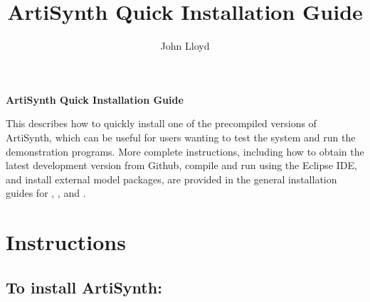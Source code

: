 \documentclass{article}
\title{ArtiSynth Quick Installation Guide}
\author{John Lloyd}
\date{}
\begin{document}

\iflatexml{\large\pubdate}\fi


\iflatexml\else
\begin{center}
{\sffamily\Large\bfseries ArtiSynth Quick Installation Guide}
\end{center}
\bigskip
\fi

This describes how to quickly install one of the precompiled versions
of ArtiSynth, which can be useful for users wanting to test the system
and run the demonstration programs. More complete instructions,
including how to obtain the latest development version from Github,
compile and run using the Eclipse IDE, and install external model
packages, are provided in the general installation guides for
, 
,
and 
.

\section{Instructions}

\subsection{To install ArtiSynth:}
\end{document}
